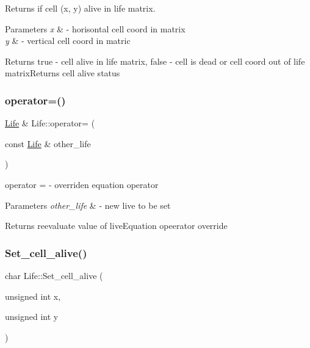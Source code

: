 Returns if cell (x, y) alive in life matrix. 


\begin{DoxyParams}{Parameters}
{\em x} & -\/ horisontal cell coord in matrix \\
\hline
{\em y} & -\/ vertical cell coord in matric \\
\hline
\end{DoxyParams}
\begin{DoxyReturn}{Returns}
true -\/ cell alive in life matrix, false -\/ cell is dead or cell coord out of life matrix\+Returns cell alive status 
\end{DoxyReturn}
\mbox{\label{class_life_a4266d1150f2cd98e9f720705c64da32e}} 
\subsubsection{\texorpdfstring{operator=()}{operator=()}}
{\footnotesize\ttfamily \mbox{\hyperlink{class_life}{Life}} \& Life\+::operator= (\begin{DoxyParamCaption}\item[{const \mbox{\hyperlink{class_life}{Life}} \&}]{other\+\_\+life }\end{DoxyParamCaption})}



operator = -\/ overriden equation operator 


\begin{DoxyParams}{Parameters}
{\em other\+\_\+life} & -\/ new live to be set \\
\hline
\end{DoxyParams}
\begin{DoxyReturn}{Returns}
reevaluate value of live\+Equation opeerator override 
\end{DoxyReturn}
\mbox{\label{class_life_af819167ad2ff35b239efb465cabe8b73}} 
\subsubsection{\texorpdfstring{Set\+\_\+cell\+\_\+alive()}{Set\_cell\_alive()}}
{\footnotesize\ttfamily char Life\+::\+Set\+\_\+cell\+\_\+alive (\begin{DoxyParamCaption}\item[{unsigned int}]{x,  }\item[{unsigned int}]{y }\end{DoxyParamCaption})}



